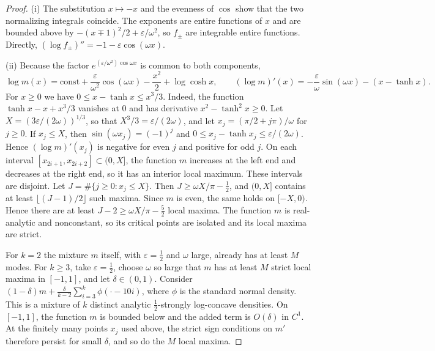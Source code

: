 \documentclass[11pt]{amsart}
\theoremstyle{definition}
\theoremstyle{remark}
\begin{document}
\begin{proof}
(i) The substitution $x\mapsto-x$ and the evenness of $\cos$ show that the
two normalizing integrals coincide.  The exponents are entire functions of
$x$ and are bounded above by $-(x\mp1)^2/2+\varepsilon/\omega^2$, so
$f_\pm$ are integrable entire functions.  Directly,
$(\log f_\pm)''=-1-\varepsilon\cos(\omega x)$.

(ii) Because the factor $e^{(\varepsilon/\omega^2)\cos\omega x}$ is common to
both components,
\[
 \log m(x)=\mathrm{const}+\frac{\varepsilon}{\omega^2}\cos(\omega x)-\frac{x^2}2+\log\cosh x,
 \qquad
 (\log m)'(x)=-\frac\varepsilon\omega\sin(\omega x)-(x-\tanh x).
\]
For $x\ge0$ we have $0\le x-\tanh x\le x^3/3$.  Indeed, the function
$\tanh x-x+x^3/3$ vanishes at $0$ and has derivative
$x^2-\tanh^2x\ge0$.  Let $X=(3\varepsilon/(2\omega))^{1/3}$, so that
$X^3/3=\varepsilon/(2\omega)$, and let $x_j=(\pi/2+j\pi)/\omega$ for
$j\ge0$.  If $x_j\le X$, then $\sin(\omega x_j)=(-1)^j$ and
$0\le x_j-\tanh x_j\le\varepsilon/(2\omega)$.  Hence $(\log m)'(x_j)$ is
negative for even $j$ and positive for odd $j$.  On each interval
$[x_{2i+1},x_{2i+2}]\subset(0,X]$, the function $m$ increases at the left
end and decreases at the right end, so it has an interior local maximum.
These intervals are disjoint.  Let $J=\#\{j\ge0:x_j\le X\}$.  Then
$J\ge\omega X/\pi-\frac12$, and $(0,X]$ contains at least
$\lfloor(J-1)/2\rfloor$ such maxima.  Since $m$ is even, the same holds on
$[-X,0)$.  Hence there are at least $J-2\ge\omega X/\pi-\frac52$ local
maxima.  The function $m$ is real-analytic and nonconstant, so its critical
points are isolated and its local maxima are strict.

For $k=2$ the mixture $m$ itself, with $\varepsilon=\frac12$ and $\omega$
large, already has at least $M$ modes.  For $k\ge3$, take
$\varepsilon=\frac12$, choose $\omega$ so large that $m$ has at least $M$
strict local maxima in $[-1,1]$, and let $\delta\in(0,1)$.  Consider
$(1-\delta)m+\frac{\delta}{k-2}\sum_{i=3}^k\phi(\cdot-10i)$, where $\phi$ is
the standard normal density.  This is a mixture of $k$ distinct analytic
$\frac12$-strongly log-concave densities.  On $[-1,1]$, the function $m$ is
bounded below and the added term is $O(\delta)$ in $C^1$.  At the finitely
many points $x_j$ used above, the strict sign conditions on $m'$ therefore
persist for small $\delta$, and so do the $M$ local maxima.
\end{proof}
\end{document}
